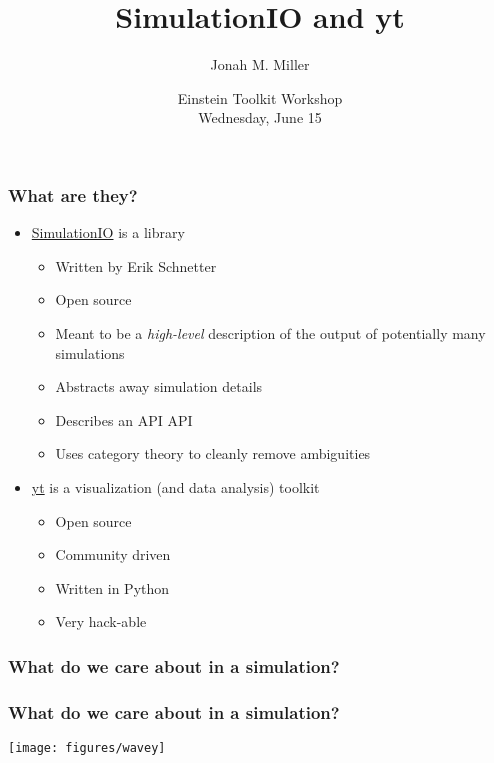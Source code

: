 \documentclass[]{beamer}
\title[SIO \& yt]{SimulationIO and yt}
\author[J. Miller]{Jonah M. Miller}
\institute[PI]{\color{blue}Perimeter Institute for Theoretical Physics}
\date[ET Workshop]{\color{black}Einstein Toolkit Workshop\\Wednesday, June 15}
\begin{document}
\begin{frame}[plain]
\titlepage
\end{frame}

\begin{frame}
  \frametitle{What are they?}
  \begin{itemize}
  \item {\color{blue}\href{https://github.com/eschnett/SimulationIO}{SimulationIO}} is a library
    \begin{itemize}
    \item Written by Erik Schnetter
    \item Open source
    \item Meant to be a \textit{high-level} description of the output of
      potentially many simulations
    \item Abstracts away simulation details
    \item Describes an API API
    \item Uses category theory to cleanly remove ambiguities
    \end{itemize}
  \item {\color{blue}\href{http://yt-project.org/}{yt}} is a
    visualization (and data analysis) toolkit
    \begin{itemize}
    \item Open source
    \item Community driven
    \item Written in Python
    \item Very hack-able
    \end{itemize}
  \end{itemize}
\end{frame}

\begin{frame}
  \frametitle{What do we care about in a simulation?}
\end{frame}

\begin{frame}
  \frametitle{What do we care about in a simulation?}
  \begin{center}
    \texttt{[image: figures/wavey]}
  \end{center}
\end{frame}
\end{document}
